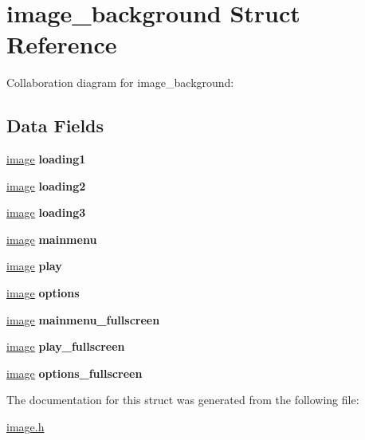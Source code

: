 \hypertarget{structimage__background}{}\section{image\+\_\+background Struct Reference}
\label{structimage__background}


Collaboration diagram for image\+\_\+background\+:
\subsection*{Data Fields}
\begin{DoxyCompactItemize}
\item 
\mbox{\label{structimage__background_aeafb02c7a7e1e86c5a81168066325526}} 
\hyperlink{structimage}{image} {\bfseries loading1}
\item 
\mbox{\label{structimage__background_a2835310e824416f6a1e41512acfa31ae}} 
\hyperlink{structimage}{image} {\bfseries loading2}
\item 
\mbox{\label{structimage__background_ab2baf91a897e467076c0747ee9ba78c4}} 
\hyperlink{structimage}{image} {\bfseries loading3}
\item 
\mbox{\label{structimage__background_a8fcf701a17fca90dfb626607823a5635}} 
\hyperlink{structimage}{image} {\bfseries mainmenu}
\item 
\mbox{\label{structimage__background_a2b0ac2520ede66f8e27c3b9cd0e2f973}} 
\hyperlink{structimage}{image} {\bfseries play}
\item 
\mbox{\label{structimage__background_aedd739a4468b6e24b738ab6c9f02711f}} 
\hyperlink{structimage}{image} {\bfseries options}
\item 
\mbox{\label{structimage__background_afc385525b3d2c9becfd9befcae40eb6e}} 
\hyperlink{structimage}{image} {\bfseries mainmenu\+\_\+fullscreen}
\item 
\mbox{\label{structimage__background_a7fa33b1dbb30a8dd49bb2c9137c8363b}} 
\hyperlink{structimage}{image} {\bfseries play\+\_\+fullscreen}
\item 
\mbox{\label{structimage__background_a06fbf729196d9c7232125e297c61ebf0}} 
\hyperlink{structimage}{image} {\bfseries options\+\_\+fullscreen}
\end{DoxyCompactItemize}


The documentation for this struct was generated from the following file\+:\begin{DoxyCompactItemize}
\item 
\hyperlink{image_8h}{image.\+h}\end{DoxyCompactItemize}
